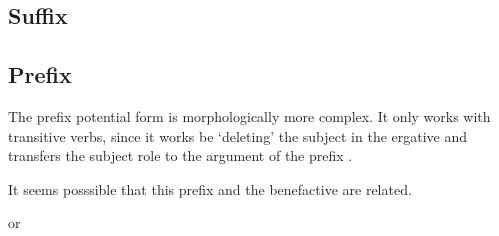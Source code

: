 \documentclass[a4paper, 10pt]{book}
\begin{document}
\subsection{Suffix {}}
\begin{exe}
    \ex
    \begin{xlist}
    \item {}
    \item {}
    \item {}
\end{xlist}
\end{exe}
\subsection{Prefix }
The prefix potential form is morphologically more complex. It only works with transitive verbs, since it works be `deleting' the subject in the ergative and transfers the subject role to the argument of the prefix .

\begin{exe}
    \ex
    \begin{xlist}
    \item {}
    \item {}
\end{xlist}
\end{exe}

It seems posssible that this prefix and the benefactive  are related.
\begin{exe}
    \ex
    \begin{xlist}
    \item {}
    \item {}
    \item {} or 
    \item {}
\end{xlist}
\end{exe}
\end{document}
